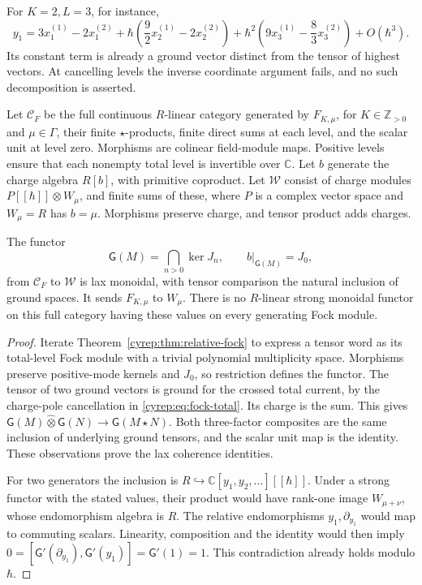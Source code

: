For \(K=2,L=3\), for instance,
\[
 y_1=3x_1^{(1)}-2x_1^{(2)}
 +\hbar\left(\frac92x_2^{(1)}-2x_2^{(2)}\right)
 +\hbar^2\left(9x_3^{(1)}-\frac83x_3^{(2)}\right)+O(\hbar^3).
\]
Its constant term is already a ground vector distinct from the
tensor of highest vectors. At cancelling levels the inverse
coordinate argument fails, and no such decomposition is asserted.

Let \(\mathscr C_F\) be the full continuous \(R\)-linear category
generated by \(F_{K,\mu}\), for \(K\in\mathbb Z_{>0}\) and
\(\mu\in\Gamma\), their finite \(\star\)-products, finite direct
sums at each level, and the scalar unit at level zero.
Morphisms are colinear field-module maps. Positive levels ensure
that each nonempty total level is invertible over \(\mathbb C\).
Let \(b\) generate the charge algebra \(R[b]\), with primitive
coproduct. Let \(\mathscr W\) consist of charge modules
\(P[[\hbar]]\otimes W_\mu\), and finite sums of these, where
\(P\) is a complex vector space and \(W_\mu=R\) has \(b=\mu\).
Morphisms preserve charge, and tensor product adds charges.

\begin{proposition}\label{cyrep:prop:ground-functor}
The functor
\[
 \mathsf G(M)=\bigcap_{n>0}\ker J_n,\qquad
 b|_{\mathsf G(M)}=J_0,
\]
from \(\mathscr C_F\) to \(\mathscr W\) is lax monoidal,
with tensor comparison the natural inclusion of ground spaces.
It sends \(F_{K,\mu}\) to \(W_\mu\).
There is no \(R\)-linear strong monoidal functor on this full
category having these values on every generating Fock module.
\end{proposition}

\begin{proof}
Iterate Theorem~\ref{cyrep:thm:relative-fock} to express a tensor
word as its total-level Fock module with a trivial polynomial
multiplicity space. Morphisms preserve positive-mode kernels
and \(J_0\), so restriction defines the functor.
The tensor of two ground vectors is ground for the crossed total
current, by the charge-pole cancellation in
\eqref{cyrep:eq:fock-total}. Its charge is the sum.
This gives \(\mathsf G(M)\widehat\otimes\mathsf G(N)
\to\mathsf G(M\star N)\).
Both three-factor composites are the same inclusion of underlying
ground tensors, and the scalar unit map is the identity.
These observations prove the lax coherence identities.

For two generators the inclusion is \(R\hookrightarrow
\mathbb C[y_1,y_2,\ldots][[\hbar]]\). Under a strong functor
with the stated values, their product would have rank-one image
\(W_{\mu+\nu}\), whose endomorphism algebra is \(R\).
The relative endomorphisms \(y_1,\partial_{y_1}\) would map to
commuting scalars. Linearity, composition and the identity would
then imply
\(0=[\mathsf G'(\partial_{y_1}),\mathsf G'(y_1)]
=\mathsf G'(1)=1\). This contradiction already holds modulo
\(\hbar\).
\end{proof}

